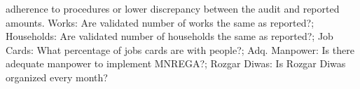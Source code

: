 \begin{table}[!htbp]
\begin{threeparttable}
\begin{tablenotes}[flushleft]
                                        adherence to procedures or lower discrepancy between the audit and reported amounts.
                                        Works: Are validated number of works the same as reported?;
                                        Households: Are validated number of households the same as reported?;
                                        Job Cards: What percentage of jobs cards are with people?;
                                        Adq. Manpower: Is there adequate manpower to implement MNREGA?;
                                        Rozgar Diwas: Is Rozgar Diwas organized every month?
\end{tablenotes}
\end{threeparttable}
\end{table}
